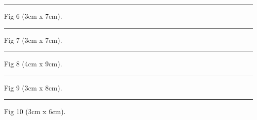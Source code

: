 \documentclass[a4paper,11pt]{article}
\begin{document}
\begin{swarmwrap}%
  \begin{minipage}[t]{3cm}
    \centering
    \rule{\linewidth}{7cm}
    {\footnotesize Fig 6 (3cm x 7cm).}
  \end{minipage}%
\end{swarmwrap}%
\swarmwrapnext
\lipsum[26]\lipsum[27]\lipsum[28]\lipsum[29]\lipsum[30]

\begin{swarmwrap}%
  \begin{minipage}[t]{3cm}
    \centering
    \rule{\linewidth}{7cm}
    {\footnotesize Fig 7 (3cm x 7cm).}
  \end{minipage}%
\end{swarmwrap}%
\swarmwrapnext
\lipsum[31]\lipsum[32]\lipsum[33]\lipsum[34]\lipsum[35]

\begin{swarmwrap}%
  \begin{minipage}[t]{4cm}
    \centering
    \rule{\linewidth}{9cm}
    {\footnotesize Fig 8 (4cm x 9cm).}
  \end{minipage}%
\end{swarmwrap}%
\swarmwrapnext
\lipsum[36]\lipsum[37]\lipsum[38]\lipsum[39]\lipsum[40]

\begin{swarmwrap}%
  \begin{minipage}[t]{3cm}
    \centering
    \rule{\linewidth}{8cm}
    {\footnotesize Fig 9 (3cm x 8cm).}
  \end{minipage}%
\end{swarmwrap}%
\swarmwrapnext
\lipsum[41]\lipsum[42]\lipsum[43]\lipsum[44]\lipsum[45]

\begin{swarmwrap}%
  \begin{minipage}[t]{3cm}
    \centering
    \rule{\linewidth}{6cm}
    {\footnotesize Fig 10 (3cm x 6cm).}
  \end{minipage}%
\end{swarmwrap}%
\swarmwrapnext
\lipsum[46]\lipsum[47]\lipsum[48]\lipsum[49]\lipsum[50]
\end{document}
